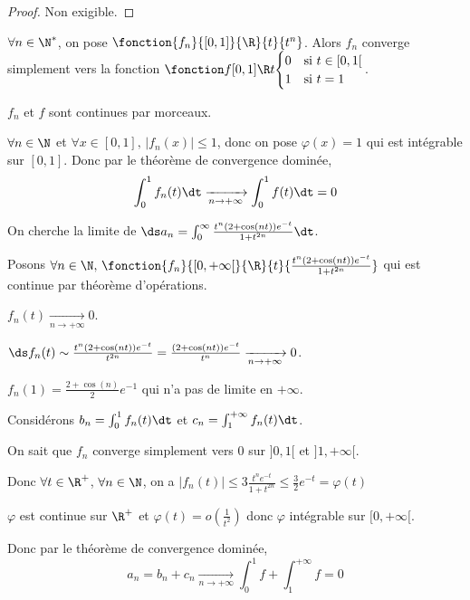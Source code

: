 \begin{proof}
    Non exigible. 
\end{proof}

\begin{exemple}
    $\forall n \in \N^*$, on pose $\fonction {f_n}{[0, 1]}{\R}{t}{t^n}$. 
    Alors $f_n$ converge simplement vers la fonction $\fonction f {[0, 1]}{\R}{t}{\begin{cases}
        0 & \text{si } t \in [0, 1[ \\
        1 & \text{si } t = 1
    \end{cases}}$.

    \svspace $f_n$ et $f$ sont continues par morceaux. 

    $\forall n \in \N$ et $\forall x \in [0, 1], \, |f_n(x)| \leqslant 1$, donc on pose 
    $\varphi(x) = 1$ qui est intégrable sur $[0, 1]$. Donc par le théorème de convergence 
    dominée, $$\int_0^1 f_n(t) \dt \xrightarrow[n \to + \infty]{} \int_0^1 f(t) \dt = 0$$
\end{exemple}

\begin{exemple}
    On cherche la limite de $\ds a_n = \int_{0 }^{ \infty } \frac{t^n(2 + \cos (nt)) e^{-t}}{1 + t^{2n}} \dt$.

    \svspace Posons $\forall n \in \N, \, \fonction {f_n}{[0, + \infty[}{\R}{t}{\frac{t^n(2 + \cos (nt)) e^{-t}}{1 + t^{2n}}}$ qui
    est continue par théorème d'opérations.


    \avspace $f_n(t) \xrightarrow[n \to + \infty]{} 0$.


    \avspace $\ds f_n(t) \sim \frac{t^n(2 + \cos(nt))e^{-t}}{t^{2n}} = \frac{(2 + \cos(nt))e^{-t}}{t^n} \xrightarrow[n \to + \infty]{} 0$.

    $f_n(1) = \frac{2 + \cos(n)}{2}e^{-1}$ qui n'a pas de limite en $+\infty$. 

    Considérons $b_n = \int_0^1 f_n(t) \dt$ et $c_n = \int_1^{+ \infty} f_n(t) \dt$.

    On sait que $f_n$ converge simplement vers $0$ sur $]0, 1[$ et $]1, + \infty[$.

    Donc $\forall t \in \R^+$, $\forall n \in \N$, on a $|f_n(t)| \leqslant 3 \frac{t^n e^{-t}}{1 + t^{2n}} \leqslant \frac 3 2 e^{-t} = \varphi(t)$

    $\varphi$ est continue sur $\R^+$ et $\varphi(t) = o\left( \frac 1 {t^2} \right)$ donc $\varphi$ 
    intégrable sur $[0, + \infty[$.

    Donc par le théorème de convergence dominée, $$a_n = b_n + c_n \xrightarrow[n \to + \infty]{} \int_{0}^{1} f + \int_1^{+ \infty} f = 0$$
\end{exemple}

